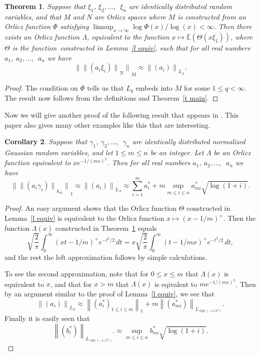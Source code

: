 \documentclass[12pt]{amsart}
\newtheorem{thm}{Theorem}
\newtheorem{cor}[thm]{Corollary}
\newcommand{\E}{{\mathbb E}}
\newcommand{\normo}[1]{{\left\|#1\right\|}}
\newcommand{\snormo}[1]{{\mathopen\|#1\mathclose\|}}
\begin{document}
\begin{thm}
\label{t orlicz}
Suppose that $\xi_1$, 
$\xi_2,\dots,$\ $\xi_n$ are identically distributed random variables,
and that $M$ and $N$ are Orlicz spaces where 
$M$ is constructed from an Orlicz function
$\Phi$ satisfying $\limsup_{x\to\infty} \log \Phi(x)/\log(x) < \infty$.
Then there exists an Orlicz
function $\Lambda$, equivalent to the function
$x\mapsto \E(\Theta(x \xi_1))$, where $\Theta$ is the function\
constructed in Lemma~\ref{l equiv}, such that for all real numbers
$a_1$, $a_2,\dots,$\ $a_n$ we have
\[
   \snormo{\snormo{(a_i \xi_i)}_N}_M \approx \snormo{(a_i)}_{L_\Lambda} .
\]
\end{thm}

\begin{proof}
The condition on $\Phi$ tells us that $L_q$ embeds into $M$ for some
$1 \le q < \infty$.
The result now follows
from the definitions and Theorem~\ref{t main}.
\end{proof}

Now we will give another proof of the following result that appears in 
\cite{gordon et al}.  This paper also gives many other examples like this
that are interesting.

\begin{cor}
Suppose that $\gamma_1$, 
$\gamma_2,\dots,$\ $\gamma_n$ are identically distributed 
normalized Gaussian
random variables,
and let $1 \le m \le n$ be an integer.
Let $\Lambda$ be an Orlicz function equivalent to $x e^{-1/(mx)^2}$.
Then for all real numbers
$a_1$, $a_2,\dots,$\ $a_n$ we have
\[
   \snormo{\snormo{(a_i \gamma_i)}_{k_m}}_1 \approx \snormo{(a_i)}_{L_\Lambda} 
   \approx \sum_{i=1}^m a^*_i 
   + m \sup_{m \le i \le n} a^*_{m i} \sqrt{\log(1+i)} .
\]
\end{cor}

\begin{proof}
An easy argument shows that the Orlicz function $\Theta$ constructed
in Lemma~\ref{l equiv} is equivalent to the 
Orlicz function $x \mapsto (x-1/m)^+$.  Then the function
$\Lambda(x)$ constructed in Theorem~\ref{t orlicz} equals
\[
\sqrt{\frac2\pi} \int_0^\infty (x t-1/m)^+ e^{-t^2/2} \, dt
=
x \sqrt{\frac2\pi} \int_0^\infty (t-1/mx)^+ e^{-t^2/2} \, dt ,
\]
and the rest the left approximation follows by simple calculations.

To see the second approximation, note that for $0 \le x \le m$ that
$\Lambda(x)$ is equivalent to $x$, and that for $x>m$ that $\Lambda(x)$
is eqivalent to $m e^{-1/(mx)^2}$.  Then 
by an argument similar to the
proof of Lemma~\ref{l equiv}, we see that 
\[ 
   \normo{(a_i)}_{L_\Lambda} \approx
   \normo{(a^*_i)_{1 \le i \le m}}_1
   +
   m \normo{(a^*_{m i})}_{L_{\exp(-1/x^2)}} .
\]
Finally it is easily seen that
\[
   \normo{(b^*_{i})}_{L_{\exp(-1/x^2)}} .
   \approx
   \sup_{m \le i \le n} b^*_{m i} \sqrt{\log(1+i)} .
\]
\end{proof}
\end{document}
